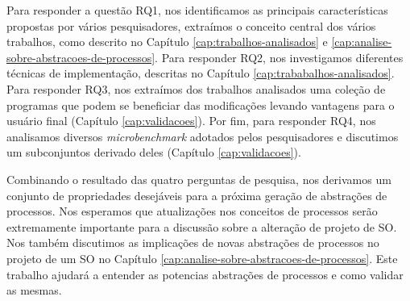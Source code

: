 Para responder a questão RQ1, nos identificamos as principais características
propostas por vários pesquisadores, extraímos o conceito central dos vários
trabalhos, como descrito no Capítulo \ref{cap:trabalhos-analisados} e
\ref{cap:analise-sobre-abstracoes-de-processos}. Para responder RQ2, nos
investigamos diferentes técnicas de implementação, descritas no Capítulo
\ref{cap:trababalhos-analisados}. Para responder RQ3, nos extraímos dos
trabalhos analisados uma coleção de programas que podem se beneficiar das
modificações levando vantagens para o usuário final (Capítulo
\ref{cap:validacoes}). Por fim, para responder RQ4, nos analisamos diversos
\emph{microbenchmark} adotados pelos pesquisadores e discutimos um subconjuntos
derivado deles (Capítulo \ref{cap:validacoes}).

Combinando o resultado das quatro perguntas de pesquisa, nos derivamos um
conjunto de propriedades desejáveis para a próxima geração de abstrações de
processos. Nos esperamos que atualizações nos conceitos de processos serão
extremamente importante para a discussão sobre a alteração de projeto de SO.
Nos também discutimos as implicações de novas abstrações de processos no
projeto de um SO no Capítulo \ref{cap:analise-sobre-abstracoes-de-processos}.
Este trabalho ajudará a entender as potencias abstrações de processos e como
validar as mesmas.
